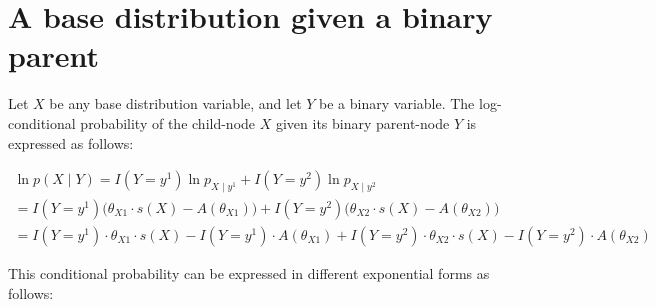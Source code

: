 \documentclass[11pt, oneside]{article}   	%
\numberwithin{figure}{section}
\numberwithin{equation}{section}
\numberwithin{table}{section}
\begin{document}
\section{A base distribution given a binary parent}

Let $X$ be any base distribution variable, and let $Y$ be a binary variable. The log-conditional probability of the child-node $X$ given its binary parent-node $Y$ is expressed as follows:

\begin{eqnarray*}
\ln p(X \mid Y) =  I(Y= y^1) \ln p_{X \mid y^1} + I(Y= y^2) \ln p_{X \mid y^2} ~~~~~~~~~~~~~~~~~~~~~~~~~~~~~~~~~~~~~~~~~~~~~~~~~~~~~\\
= I(Y= y^1)  \Big(\theta_{X1} \cdot s(X) - A(\theta_{X1})\Big) +  I(Y= y^2) \Big(\theta_{X2} \cdot s(X) - A(\theta_{X2})\Big) ~~~~~~~~~~~~~~~~~~~~~~~~~~~~\\
= I(Y=y^1) \cdot \theta_{X1} \cdot s(X) - I(Y=y^1) \cdot A(\theta_{X1}) +  I(Y=y^2) \cdot \theta_{X2} \cdot s(X) - I(Y=y^2) \cdot A(\theta_{X2})
\end{eqnarray*}

This conditional probability can be expressed in different exponential forms as follows:
\end{document}
